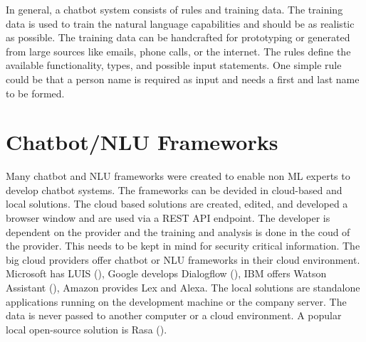 In general, a chatbot system consists of rules and training data.
The training data is used to train the natural language capabilities and 
should be as realistic as possible.
The training data can be handcrafted for prototyping or generated from large sources like emails, phone calls,
or the internet.
The rules define the available functionality, types, and possible input statements.
One simple rule could be that a person name is required as input and needs a first and last name to be formed.


\section{Chatbot/NLU Frameworks}
Many chatbot and NLU frameworks were created to enable non ML experts to 
develop chatbot systems.
The frameworks can be devided in cloud-based and local solutions.
The cloud based solutions are created, edited, and developed a browser window 
and are used via a REST API endpoint.
The developer is dependent on the provider and the training and analysis is done 
in the coud of the provider. This needs to be kept in mind for security critical 
information.
The big cloud providers offer chatbot or NLU frameworks in their cloud environment.
Microsoft has LUIS (\citet{luis2015williams, luisdocs}),
Google develops Dialogflow (\citet{dialogflow}),
IBM offers Watson Assistant (\citet{watsonassistant}),
Amazon provides Lex and Alexa.
The local solutions are standalone applications running on the development machine or 
the company server.
The data is never passed to another computer or a cloud environment.
A popular local open-source solution is Rasa (\citet{rasabocklisch2017,rasa}). 


